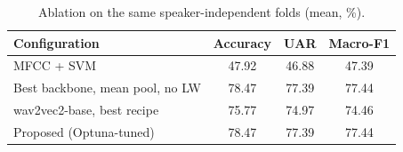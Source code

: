 \begin{table}[t]
\centering
\caption{Ablation on the same speaker-independent folds (mean, \%).}
\label{tab:ablation}
\begin{tabular}{lccc}
\toprule
Configuration & Accuracy & UAR & Macro-F1 \\
\midrule
MFCC + SVM & 47.92 & 46.88 & 47.39 \\
Best backbone, mean pool, no LW & 78.47 & 77.39 & 77.44 \\
wav2vec2-base, best recipe & 75.77 & 74.97 & 74.46 \\
Proposed (Optuna-tuned) & 78.47 & 77.39 & 77.44 \\
\bottomrule
\end{tabular}
\end{table}